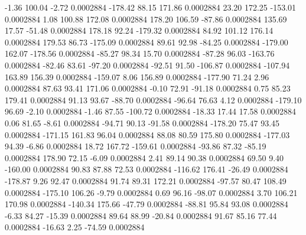        -1.36      100.04       -2.72     0.0002884
     -178.42       88.15      171.86     0.0002884
       23.20      172.25     -153.01     0.0002884
        1.08      100.88      172.08     0.0002884
      178.20      106.59      -87.86     0.0002884
      135.69       17.57      -51.48     0.0002884
      178.18       92.24     -179.32     0.0002884
       84.92      101.12      176.14     0.0002884
      179.53       86.73     -175.09     0.0002884
       89.61       92.98      -84.25     0.0002884
     -179.00      162.07     -178.56     0.0002884
      -85.27       98.34       15.70     0.0002884
      -87.28       96.03     -163.76     0.0002884
      -82.46       83.61      -97.20     0.0002884
      -92.51       91.50     -106.87     0.0002884
     -107.94      163.89      156.39     0.0002884
     -159.07        8.06      156.89     0.0002884
     -177.90       71.24        2.96     0.0002884
       87.63       93.41      171.06     0.0002884
       -0.10       72.91      -91.18     0.0002884
        0.75       85.23      179.41     0.0002884
       91.13       93.67      -88.70     0.0002884
      -96.64       76.63        4.12     0.0002884
     -179.10       96.69       -2.10     0.0002884
       -1.46       87.55     -100.72     0.0002884
      -18.33       17.44       17.58     0.0002884
        0.06       81.65       -8.61     0.0002884
      -94.71       90.13      -91.58     0.0002884
     -178.20       75.47       93.45     0.0002884
     -171.15      161.83       96.04     0.0002884
       88.08       80.59      175.80     0.0002884
     -177.03       94.39       -6.86     0.0002884
       18.72      167.72     -159.61     0.0002884
      -93.86       87.32      -85.19     0.0002884
      178.90       72.15       -6.09     0.0002884
        2.41       89.14       90.38     0.0002884
       69.50        9.40     -160.00     0.0002884
       90.83       87.88       72.53     0.0002884
     -116.62      176.41      -26.49     0.0002884
     -178.87        9.26       92.47     0.0002884
       91.74       89.31      172.21     0.0002884
      -97.57       80.47      108.49     0.0002884
     -175.10      106.26       -9.79     0.0002884
        0.69       96.16      -98.07     0.0002884
        3.70      106.21      170.98     0.0002884
     -140.34      175.66      -47.79     0.0002884
      -88.81       95.84       93.08     0.0002884
       -6.33       84.27      -15.39     0.0002884
       89.64       88.99      -20.84     0.0002884
       91.67       85.16       77.44     0.0002884
      -16.63        2.25      -74.59     0.0002884
